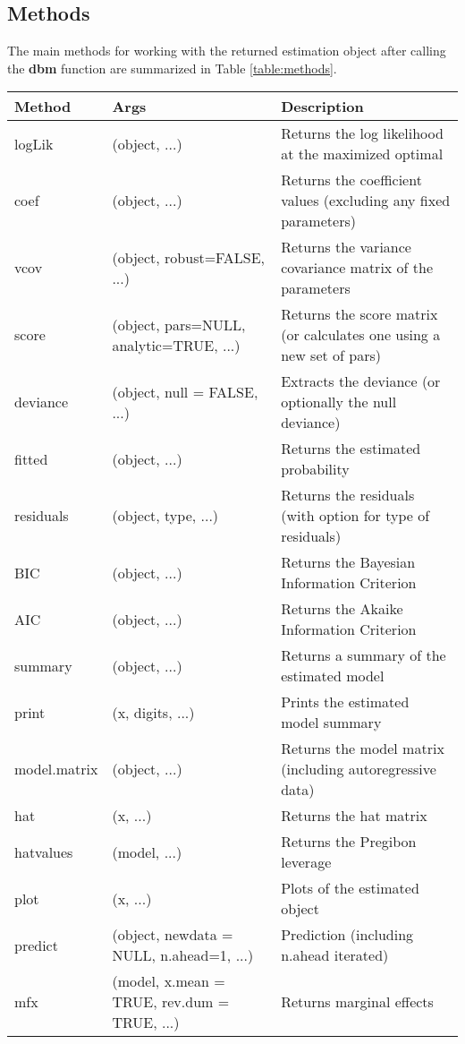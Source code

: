 \subsection{Methods}
The main methods for working with the returned estimation object after calling the \textbf{dbm} function are summarized in Table \ref{table:methods}.
{\tiny
{}
{
}{
\FL
\begin{tabular*}{1\textwidth}{@{\extracolsep{\fill}}lll}
    \textbf{Method} & \textbf{Args} & \textbf{Description} \\
    \hline
    logLik & (object, ...) & Returns the log likelihood at the maximized optimal \\
    coef  & (object, ...) & Returns the coefficient values (excluding any fixed parameters) \\
    vcov  & (object, robust=FALSE, ...) & Returns the variance covariance matrix of the parameters \\
    score & (object, pars=NULL, analytic=TRUE, ...) & Returns the score matrix (or calculates one using a new set of pars) \\
    deviance & (object, null = FALSE, ...) & Extracts the deviance (or optionally the null deviance) \\
    fitted & (object, ...) & Returns the estimated probability \\
    residuals & (object, type, ...) & Returns the residuals (with option for type of residuals) \\
    BIC   & (object, ...) & Returns the Bayesian Information Criterion \\
    AIC   & (object, ...) & Returns the Akaike Information Criterion \\
    summary & (object, ...) & Returns a summary of the estimated model \\
    print & (x, digits, ...) & Prints the estimated model summary \\
    model.matrix & (object, ...) & Returns the model matrix (including autoregressive data) \\
    hat   & (x, ...) & Returns the hat matrix \\
    hatvalues & (model, ...) & Returns the Pregibon leverage \\
    plot  & (x, ...) & Plots of the estimated object \\
    predict & (object, newdata = NULL, n.ahead=1, ...) & Prediction (including n.ahead iterated) \\
    mfx   & (model, x.mean = TRUE, rev.dum = TRUE, ...) & Returns marginal effects \\
\end{tabular*}
\LL
}}


